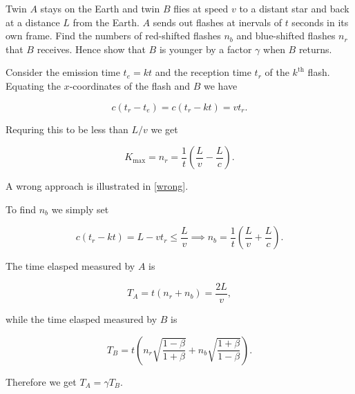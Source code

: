 \documentclass[english,a4paper,12pt]{report}
\begin{document}
{Twin \(A\) stays on the Earth and twin \(B\) flies at speed \(v\) to a distant star and back at a distance \(L\) from the Earth. \(A\) sends out flashes at inervals of \(t\) seconds in its own frame. Find the numbers of red-shifted flashes \(n_{b} \) and blue-shifted flashes \(n_{r} \) that \(B\) receives. Hence show that \(B\) is younger by a factor \(\gamma \) when \(B\) returns. }
{Consider the emission time \(t_{e} = kt\) and the reception time \(t_{r} \) of the \(k^{\text{th}} \) flash. Equating the \(x\)-coordinates of the flash and \(B\)  we have 

\begin{equation}
    c(t_{r} - t_{e}  ) = c(t_{r} - kt ) = vt_{r}. 
\end{equation}

Requring this to be less than \(L/v\) we get 

\begin{equation}
    K_{\text{max} } = n_{r} = \frac{1}{t} \left( \frac{L}{v} - \frac{L}{c}   \right).
\end{equation}

A wrong approach is illustrated in \cref{wrong}. 

To find \(n_{b} \) we simply set 

\begin{equation}
    c(t_{r} - kt  ) = L-vt_{r} \le \frac{L}{v} \implies n_{b} = \frac{1}{t} \left( \frac{L}{v} + \frac{L}{c}   \right)  .
\end{equation}

The time elasped measured by \(A\) is 

\begin{equation}
    T_{A} = t(n_{r} + n_{b}  ) = \frac{2L}{v},  
\end{equation}

while the time elasped measured by \(B\) is 

\begin{equation}
    T_{B} = t\left( n_{r} \sqrt{\frac{1-\beta }{1+\beta } }  + n_{b} \sqrt{\frac{1+\beta }{1-\beta } }   \right).
\end{equation}

Therefore we get \(T_{A}  = \gamma T_{B}  \). 
} 

\end{document}
